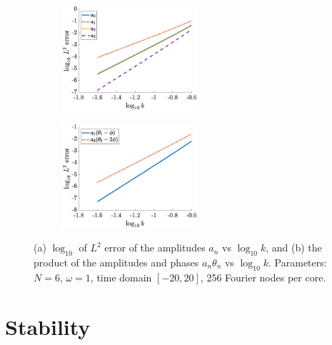 \documentclass[11pt,reqno]{amsart}
\begin{document}
\begin{figure}
    \centering
    \begin{subfigure}{0.4\linewidth}
        \caption{}
        \label{fig:m6errora}
        \includegraphics[width=5cm]{N6aerror.eps}
    \end{subfigure}
    \begin{subfigure}{0.4\linewidth}
        \caption{}
        \label{fig:m6errorb}
        \includegraphics[width=5cm]{N6athetaerror.eps}
    \end{subfigure}
    \caption{(a) $\log_{10}$ of $L^2$ error of the amplitudes $a_n$ vs $\log_{10} k$, and (b) the product of the amplitudes and phases $a_n \theta_n $ vs $\log_{10} k$. Parameters: $N=6$, $\omega=1$, time domain $[-20,20]$, 256 Fourier nodes per core.}
    \label{fig:m6error}
\end{figure}

\section{Stability}\label{sec:stability}
\end{document}
